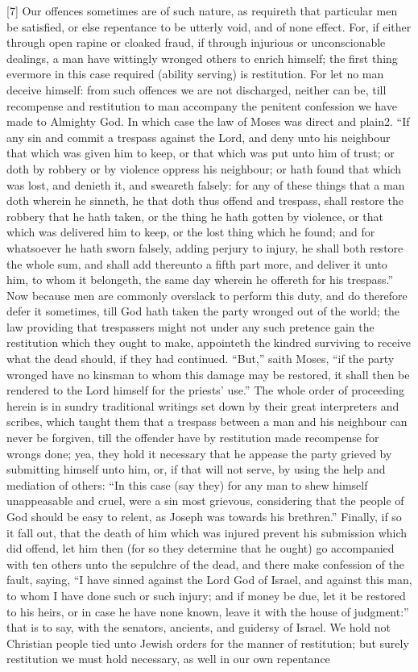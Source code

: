 [7] Our offences sometimes are of such nature, as requireth that particular men be satisfied, or else repentance to be utterly void, and of none effect. For, if either through open rapine or cloaked fraud, if through injurious or unconscionable dealings, a man have wittingly wronged others to enrich himself; the first thing evermore in this case required (ability serving) is restitution. For let no man deceive himself: from such offences we are not discharged, neither can be, till recompense and restitution to man accompany the penitent confession we have made to Almighty God. In which case the law of Moses was direct and plain2. “If any sin and commit a trespass against the Lord, and deny unto his neighbour that which was given him to keep, or that which was put unto him of trust; or doth by robbery or by violence oppress his neighbour; or hath found that which was lost, and denieth it, and sweareth falsely: for any of these things that a man doth wherein he sinneth, he that doth thus offend and trespass, shall restore the robbery that he hath taken, or the thing he hath gotten by violence, or that which was delivered him to keep, or the lost thing which he found; and for whatsoever he hath sworn falsely, adding perjury to injury, he shall both restore the whole sum, and shall add thereunto a fifth part more, and deliver  it unto him, to whom it belongeth, the same day wherein he offereth for his trespass.” Now because men are commonly overslack to perform this duty, and do therefore defer it sometimes, till God hath taken the party wronged out of the world; the law providing that trespassers might not under any such pretence gain the restitution which they ought to make, appointeth the kindred surviving to receive what the dead should, if they had continued. “But,” saith Moses, “if the party wronged have no kinsman to whom this damage may be restored, it shall then be rendered to the Lord himself for the priests’ use.” The whole order of proceeding herein is in sundry traditional writings set down by their great interpreters and scribes, which taught them that a trespass between a man and his neighbour can never be forgiven, till the offender have by restitution made recompense for wrongs done; yea, they hold it necessary that he appease the party grieved by submitting himself unto him, or, if that will not serve, by using the help and mediation of others: “In this case (say they) for any man to shew himself unappeasable and cruel, were a sin most grievous, considering that the people of God should be easy to relent, as Joseph was towards his brethren.” Finally, if so it fall out, that the death of him which was injured prevent his submission which did offend, let him then (for so they determine that he ought) go accompanied with ten others unto the sepulchre of the dead, and there make confession of the fault, saying, “I have sinned against the Lord God of Israel, and against this man, to whom I have done such or such injury; and if money be due, let it be restored to his heirs, or in case he have none known, leave it with the house of judgment:” that is to say, with the senators, ancients, and guidersy of Israel. We hold not Christian people tied unto Jewish orders for the manner of restitution; but surely restitution we must hold necessary, as well in our own repentance 